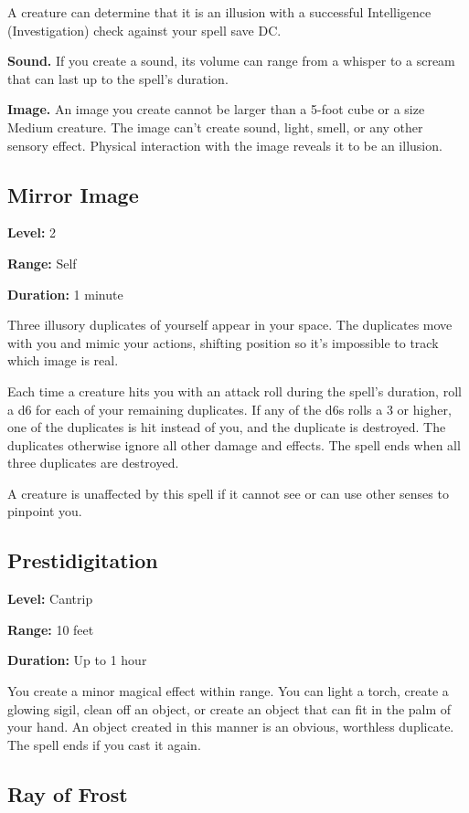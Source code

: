 \documentclass[12pt,letterpaper,twocolumn,openany,nodeprecatedcode,bg=none]{dndbook}
\let\oldsubsection\subsection
\renewcommand{\subsection}[1]{%
  \needspace{5\baselineskip}%
  \oldsubsection{#1}%
}
\begin{document}
A creature can determine that it is an illusion with a successful
Intelligence (Investigation) check against your spell save DC.

\textbf{Sound.} If you create a sound, its volume can range from a
whisper to a scream that can last up to the spell's duration.

\textbf{Image.} An image you create cannot be larger than a 5-foot cube
or a size Medium creature. The image can't create sound, light, smell,
or any other sensory effect. Physical interaction with the image reveals
it to be an illusion.

\subsection{Mirror Image}\label{mirror-image}

\textbf{Level:} 2

\textbf{Range:} Self

\textbf{Duration:} 1 minute

Three illusory duplicates of yourself appear in your space. The
duplicates move with you and mimic your actions, shifting position so
it's impossible to track which image is real.

Each time a creature hits you with an attack roll during the spell's
duration, roll a d6 for each of your remaining duplicates. If any of the
d6s rolls a 3 or higher, one of the duplicates is hit instead of you,
and the duplicate is destroyed. The duplicates otherwise ignore all
other damage and effects. The spell ends when all three duplicates are
destroyed.

A creature is unaffected by this spell if it cannot see or can use other
senses to pinpoint you.

\subsection{Prestidigitation}\label{prestidigitation}

\textbf{Level:} Cantrip

\textbf{Range:} 10 feet

\textbf{Duration:} Up to 1 hour

You create a minor magical effect within range. You can light a torch,
create a glowing sigil, clean off an object, or create an object that
can fit in the palm of your hand. An object created in this manner is an
obvious, worthless duplicate. The spell ends if you cast it again.

\subsection{Ray of Frost}\label{ray-of-frost}
\end{document}
